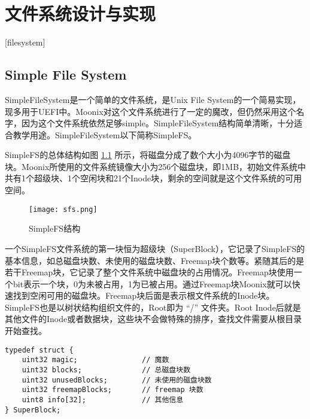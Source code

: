 
\chapter{文件系统设计与实现}[filesystem]
\label{chapter:filesystem}

\section{Simple File System}

SimpleFileSystem是一个简单的文件系统，是Unix File System\cite{ufs}\cite{DBLP:conf/amast/Heisel95}的一个简易实现，现多用于UEFI中。Moonix对这个文件系统进行了一定的魔改，但仍然采用这个名字，因为这个文件系统依然足够simple。SimpleFileSystem结构简单清晰，十分适合教学用途。SimpleFileSystem以下简称SimpleFS。

SimpleFS的总体结构如图 \ref{pic:sfs} 所示，将磁盘分成了数个大小为4096字节的磁盘块。Moonix所使用的文件系统镜像大小为256个磁盘块，即1MB，初始文件系统中共有1个超级块、1个空闲块和21个Inode块，剩余的空间就是这个文件系统的可用空间。

\begin{figure}[htpb]
	\centering
	\texttt{[image: sfs.png]}
	\setlength{\abovecaptionskip}{2pt}
	\caption{SimpleFS结构}
	\label{pic:sfs}
\end{figure}

一个SimpleFS文件系统的第一块恒为超级块（SuperBlock），它记录了SimpleFS的基本信息，如总磁盘块数、未使用的磁盘块数、Freemap块个数等。紧随其后的是若干Freemap块，它记录了整个文件系统中磁盘块的占用情况。Freemap块使用一个bit表示一个块，0为未被占用，1为已被占用。通过Freemap块Moonix就可以快速找到空闲可用的磁盘块。Freemap块后面是表示根文件系统的Inode块。SimpleFS也是以树状结构组织文件的，Root即为 “/” 文件夹。Root Inode后就是其他文件的Inode或者数据块，这些块不会做特殊的排序，查找文件需要从根目录开始查找。

\begin{minipage}[c]{0.95\textwidth}
\begin{lstlisting}[language={moonix}, caption={SimpleFS超级块结构}, label={lst:superblock}]
typedef struct {
	uint32 magic;               // 魔数
	uint32 blocks;              // 总磁盘块数
	uint32 unusedBlocks;        // 未使用的磁盘块数
	uint32 freemapBlocks;       // freemap 块数
	uint8 info[32];             // 其他信息
} SuperBlock;
\end{lstlisting}
\end{minipage}

